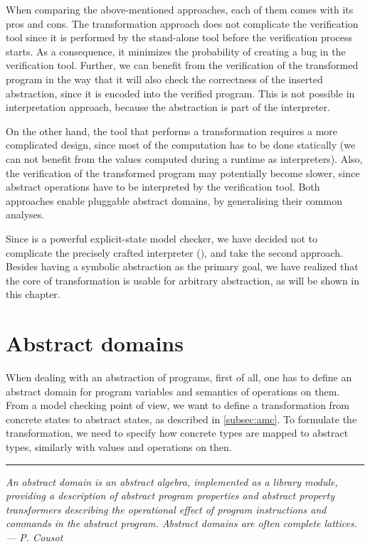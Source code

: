 When comparing the above-mentioned approaches, each of them comes with its pros
and cons. The transformation approach does not complicate the verification tool
since it is performed by the stand-alone tool before the verification process
starts. As a consequence, it minimizes the probability of creating a bug in the
verification tool. Further, we can benefit from the verification of the
transformed program in the way that it will also check the correctness of the
inserted abstraction, since it is encoded into the verified program. This is not possible
in interpretation approach, because the abstraction is part of the interpreter.

On the other hand, the tool that performs a transformation requires a more
complicated design, since most of the computation has to be done statically (we
can not benefit from the values computed during a runtime as interpreters). Also, the verification of the transformed program may potentially become slower, since
abstract operations have to be interpreted by the verification tool.  Both
approaches enable pluggable abstract domains, by generalising their common
analyses.

Since \DIVINE is a powerful explicit-state model checker, we have decided not to
complicate the precisely crafted interpreter (\DIVM), and take the second
approach. Besides having a symbolic abstraction as the primary goal, we have
realized that the core of transformation is usable for arbitrary abstraction, as
will be shown in this chapter.

\section{Abstract domains} \label{sec:absdom}

When dealing with an abstraction of programs, first of all, one has to define an
abstract domain for program variables and semantics of operations on them. From
a model checking point of view, we want to define a transformation from
concrete states to abstract states, as described in \autoref{subsec:amc}. To
formulate the transformation, we need to specify how concrete types are mapped to
abstract types, similarly with values and operations on then.

\newpage

\hrule

\bigskip
\noindent
\textit{An abstract domain is an abstract algebra, implemented as a library module,
providing a description of abstract program properties and abstract property
transformers describing the operational effect of program instructions and
commands in the abstract program. Abstract domains are often complete lattices.
--- P. Cousot \cite{Cousot79} }
\bigskip

